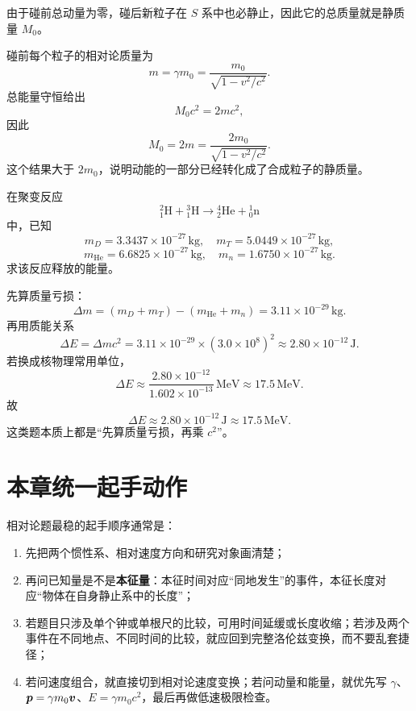 \documentclass[lang=cn,11pt]{elegantbook}
\begin{document}
\begin{solution}
由于碰前总动量为零，碰后新粒子在 \(S\) 系中也必静止，因此它的总质量就是静质量 \(M_0\)。

碰前每个粒子的相对论质量为
\[
m=\gamma m_0=\frac{m_0}{\sqrt{1-v^2/c^2}}.
\]
总能量守恒给出
\[
M_0c^2=2mc^2,
\]
因此
\[
\boxed{
M_0=2m
=\frac{2m_0}{\sqrt{1-v^2/c^2}}.
}
\]
这个结果大于 \(2m_0\)，说明动能的一部分已经转化成了合成粒子的静质量。
\end{solution}

\begin{example}[氘氚聚变释放的能量]
在聚变反应
\[
{}^2_1\mathrm{H}+{}^3_1\mathrm{H}\to {}^4_2\mathrm{He}+{}^1_0\mathrm{n}
\]
中，已知
\[
m_D=3.3437\times 10^{-27}\,\mathrm{kg},\quad
m_T=5.0449\times 10^{-27}\,\mathrm{kg},
\]
\[
m_{\mathrm{He}}=6.6825\times 10^{-27}\,\mathrm{kg},\quad
m_n=1.6750\times 10^{-27}\,\mathrm{kg}.
\]
求该反应释放的能量。
\end{example}

\begin{solution}
先算质量亏损：
\[
\Delta m=(m_D+m_T)-(m_{\mathrm{He}}+m_n)
=3.11\times 10^{-29}\,\mathrm{kg}.
\]
再用质能关系
\[
\Delta E=\Delta mc^2
=3.11\times 10^{-29}\times (3.0\times 10^8)^2
\approx 2.80\times 10^{-12}\,\mathrm{J}.
\]
若换成核物理常用单位，
\[
\Delta E\approx \frac{2.80\times 10^{-12}}{1.602\times 10^{-13}}\,\mathrm{MeV}
\approx 17.5\,\mathrm{MeV}.
\]
故
\[
\boxed{\Delta E\approx 2.80\times 10^{-12}\,\mathrm{J}\approx 17.5\,\mathrm{MeV}.}
\]
这类题本质上都是“先算质量亏损，再乘 \(c^2\)”。
\end{solution}

\section{本章统一起手动作}

相对论题最稳的起手顺序通常是：
\begin{enumerate}
  \item 先把两个惯性系、相对速度方向和研究对象画清楚；
  \item 再问已知量是不是\textbf{本征量}：本征时间对应“同地发生”的事件，本征长度对应“物体在自身静止系中的长度”；
  \item 若题目只涉及单个钟或单根尺的比较，可用时间延缓或长度收缩；若涉及两个事件在不同地点、不同时间的比较，就应回到完整洛伦兹变换，而不要乱套捷径；
  \item 若问速度组合，就直接切到相对论速度变换；若问动量和能量，就优先写 \(\gamma\)、\(\vb*{p}=\gamma m_0\vb*{v}\)、\(E=\gamma m_0c^2\)，最后再做低速极限检查。
\end{enumerate}
\end{document}
